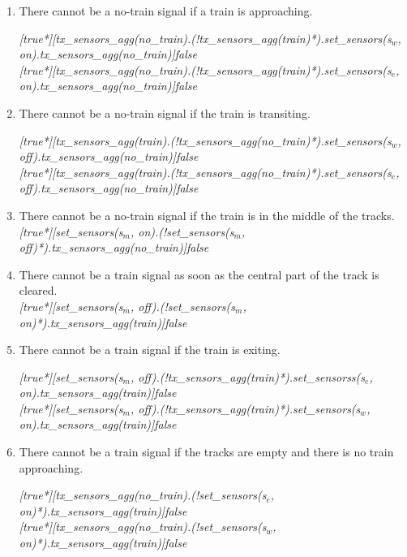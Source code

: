 \documentclass[final]{report}
\begin{document}
\begin{enumerate}
\item There cannot be a no-train signal if a train is approaching.

\textit{[true*][tx\_sensors\_agg(no\_train).(!tx\_sensors\_agg(train)*).set\_sensors(s$_{w}$, on).tx\_sensors\_agg(no\_train)]false}\\
\textit{[true*][tx\_sensors\_agg(no\_train).(!tx\_sensors\_agg(train)*).set\_sensors(s$_{e}$, on).tx\_sensors\_agg(no\_train)]false} 


\item There cannot be a no-train signal if the train is transiting.

\textit{[true*][tx\_sensors\_agg(train).(!tx\_sensors\_agg(no\_train)*).set\_sensors(s$_{w}$, off).tx\_sensors\_agg(no\_train)]false}\\
\textit{[true*][tx\_sensors\_agg(train).(!tx\_sensors\_agg(no\_train)*).set\_sensors(s$_{e}$, off).tx\_sensors\_agg(no\_train)]false}


\item There cannot be a no-train signal if the train is in the middle of the tracks.\\
\textit{[true*][set\_sensors(s$_{m}$, on).(!set\_sensors(s$_{m}$, off)*).tx\_sensors\_agg(no\_train)]false}

\item There cannot be a train signal as soon as the central part of the track is cleared.\\
\textit{[true*][set\_sensors(s$_{m}$, off).(!set\_sensors(s$_{m}$, on)*).tx\_sensors\_agg(train)]false
}

\item There cannot be a train signal if the train is exiting.

\textit{[true*][set\_sensors(s$_{m}$, off).(!tx\_sensors\_agg(train)*).set\_sensorss(s$_{e}$, on).tx\_sensors\_agg(train)]false}\\
\textit{[true*][set\_sensors(s$_{m}$, off).(!tx\_sensors\_agg(train)*).set\_sensors(s$_{w}$, on).tx\_sensors\_agg(train)]false}


\item There cannot be a train signal if the tracks are empty and there is no train approaching.

\textit{[true*][tx\_sensors\_agg(no\_train).(!set\_sensors(s$_{e}$, on)*).tx\_sensors\_agg(train)]false}\\
\textit{[true*][tx\_sensors\_agg(no\_train).(!set\_sensors(s$_{w}$, on)*).tx\_sensors\_agg(train)]false}


\end{enumerate}
\end{document}
